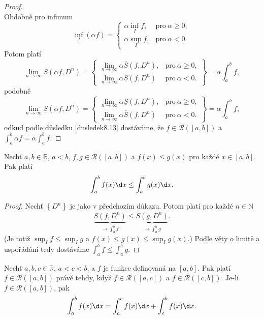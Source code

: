 \begin{proof}
$$	$$
	Obdobně pro infimum
	$$
	    \inf_I (\alpha f) = \begin{cases}
					\alpha \inf _I f, & \text{pro} \ \alpha \geq 0,\\
					\alpha \sup _I f, & \text{pro} \ \alpha < 0.
					\end{cases}
	$$
	Potom platí
	$$
 \lim_{n \to \infty} \overline S(\alpha f, D^n) = \left .\begin{cases}
 \lim_{n \to \infty} \alpha \overline S(f,D^n), & \text{pro} \ \alpha \geq 0, \\
 \lim_{n \to \infty} \alpha \underline S(f,D^n) & \text{pro} \ \alpha < 0.
 \end{cases} \right \} = \alpha \int_a^b f,
	$$
	podobně
	$$
	\lim_{n \to \infty} \underline S(\alpha f, D^n) =\left . \begin{cases}
 \lim_{n \to \infty} \alpha \underline S(f,D^n), & \text{pro} \ \alpha \geq 0, \\
 \lim_{n \to \infty} \alpha \overline S(f,D^n) & \text{pro} \ \alpha < 0.
 \end{cases}\right \} =  \alpha \int_a^b f,
	$$
	odkud podle důsledku \ref{dusledek8.13} dostáváme, že $f\in \mathcal R([a,b])$ a
	$\int_a^b \alpha f  = \alpha \int _a^b f$.
\end{proof}

\begin{veta}\label{veta8.19}
Nechť $a,b \in \mathbb{R}$, $a<b$, $f,g \in \mathcal R([a,b])$ a $f(x) \le g(x)$ pro každé $x \in [a,b]$. Pak platí
\[
\int_a^b f(x)\d x \le \int_a^b g(x)\d x.
\]
\end{veta}

\begin{proof}
	Nechť $\left \{ D^n \right \} $ je jako v předchozím důkazu. Potom platí pro každé $n \in \mathbb N $
	$$
	    \underbrace{\overline S(f, D^n)}_{\to \int _a^b f} \leq \underbrace{\overline S(g,D^n)}_{\to \int_a^b g}.
	$$
	(Je totiž $\sup_I f \leq \sup _I g$ a $f(x) \leq g(x)\leq \sup_I g(x)$.) Podle věty o limitě a uspořádání
	tedy dostáváme $\int _a^b f \leq \int_a^b g$.
\end{proof}

\begin{veta}\label{veta8.20}
Nechť $a,b,c \in \mathbb{R}$, $a<c<b$, a $f$ je funkce definovaná na $[a,b]$. Pak platí
$
f \in \mathcal R([a,b])$ právě tehdy, když $ f \in \mathcal R([a,c])$ a $f \in \mathcal R([c,b])$.
Je-li $f \in \mathcal R([a,b])$, pak
\[
\int_a^b f(x)\d x = \int_a^c f(x)\d x + \int_c^b f(x)\d x.
\]
\end{veta}

